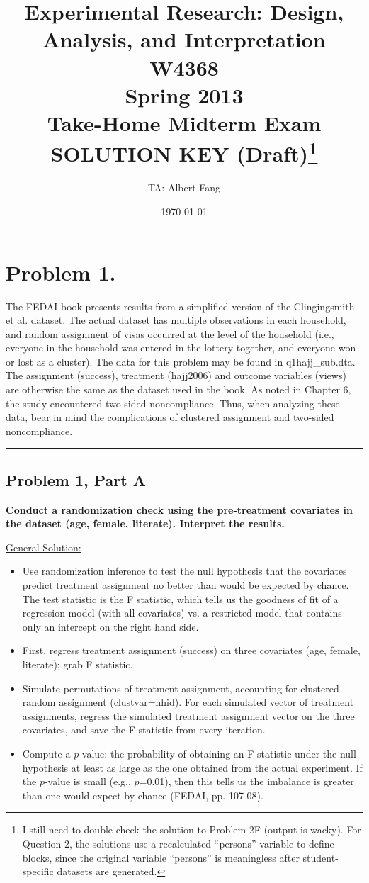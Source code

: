 \documentclass[11pt,notitlepage]{article}
\title{\large\bf Experimental Research: Design, Analysis, and Interpretation\\ \mdseries W4368\\Spring 2013\\Take-Home Midterm Exam\\[0.5cm] {\bf SOLUTION KEY (Draft)}\footnote{I still need to double check the solution to Problem 2F (output is wacky). For Question 2, the solutions use a recalculated ``persons'' variable to define blocks, since the original variable ``persons'' is meaningless after student-specific datasets are generated.}}
\author{TA: Albert Fang}
\date{\today}
\begin{document}
\maketitle
\frenchspacing
\singlespacing


\tableofcontents

\clearpage

\section{Problem 1.}  The FEDAI book presents results from a simplified version of the Clingingsmith et al. dataset.  The actual dataset has multiple observations in each household, and random assignment of visas occurred at the level of the household (i.e., everyone in the household was entered in the lottery together, and everyone won or lost as a cluster).  The data for this problem may be found in q1hajj\_sub.dta.  The assignment (success), treatment (hajj2006) and outcome variables (views) are otherwise the same as the dataset used in the book.  As noted in Chapter 6, the study encountered two-sided noncompliance.  Thus, when analyzing these data, bear in mind the complications of clustered assignment and two-sided noncompliance.

\vspace{.5cm}
\hrule
\vspace{.5cm}

\subsection{Problem 1, Part A} {\bf Conduct a randomization check using the pre-treatment covariates in the dataset (age, female, literate).  Interpret the results.}

\vspace{1cm}

\underline{{\sc General Solution:}}
\begin{itemize}
\item Use randomization inference to test the null hypothesis that the covariates predict treatment assignment no better than would be expected by chance. The test statistic is the F statistic, which tells us the goodness of fit of a regression model (with all covariates) vs. a restricted model that contains only an intercept on the right hand side.
\item First, regress treatment assignment (success) on three covariates (age, female, literate); grab F statistic.
\item Simulate permutations of treatment assignment, accounting for clustered random assignment (clustvar=hhid). For each simulated vector of treatment assignments, regress the simulated treatment assignment vector on the three covariates, and save the F statistic from every iteration.
\item Compute a $p$-value: the probability of obtaining an F statistic under the null hypothesis at least as large as the one obtained from the actual experiment. If the $p$-value is small (e.g., $p$=0.01), then this tells us the imbalance is greater than one would expect by chance (FEDAI, pp. 107-08).
\end{itemize}
\end{document}
